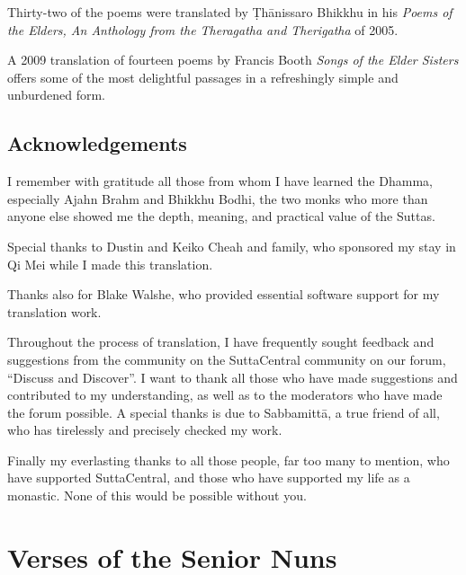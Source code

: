 \documentclass[12pt,openany]{book}%
\let\oldcontentsline\contentsline
\newcommand{\nopagecontentsline}[3]{\oldcontentsline{#1}{#2}{}}
\let\oldmainmatter\mainmatter
\renewcommand{\mainmatter}{%
\chapterfont{\setstretch{.85}\normalfont\centering}%
\sectionfont{\setstretch{.85}\normalfont\centering}%
\oldmainmatter}
\begin{document}
Thirty-two of the poems were translated by \textsanskrit{Ṭhānissaro} Bhikkhu in his \textit{Poems of the Elders, An Anthology from the Theragatha and Therigatha} of 2005.

A 2009 translation of fourteen poems by Francis Booth \textit{Songs of the Elder Sisters} offers some of the most delightful passages in a refreshingly simple and unburdened form.

%
\chapter*{Acknowledgements}

I remember with gratitude all those from whom I have learned the Dhamma, especially Ajahn Brahm and Bhikkhu Bodhi, the two monks who more than anyone else showed me the depth, meaning, and practical value of the Suttas.

Special thanks to Dustin and Keiko Cheah and family, who sponsored my stay in Qi Mei while I made this translation.

Thanks also for Blake Walshe, who provided essential software support for my translation work.

Throughout the process of translation, I have frequently sought feedback and suggestions from the community on the SuttaCentral community on our forum, “Discuss and Discover”. I want to thank all those who have made suggestions and contributed to my understanding, as well as to the moderators who have made the forum possible. A special thanks is due to \textsanskrit{Sabbamittā}, a true friend of all, who has tirelessly and precisely checked my work.

Finally my everlasting thanks to all those people, far too many to mention, who have supported SuttaCentral, and those who have supported my life as a monastic. None of this would be possible without you.

%
\mainmatter%
\pagestyle{fancy}%
\part*{Verses of the Senior Nuns}
\markboth{}{}
\addtocontents{toc}{\let\protect\contentsline\protect\oldcontentsline}

%
\end{document}
